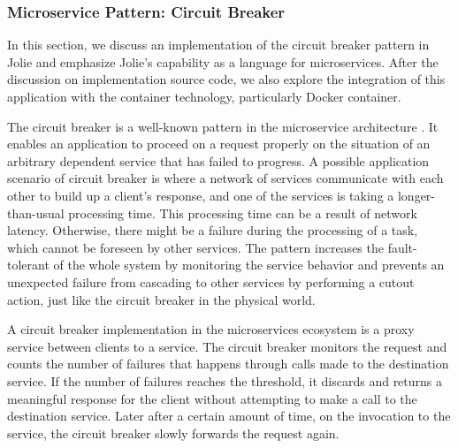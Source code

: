 \FloatBarrier

\subsubsection{Microservice Pattern: Circuit Breaker}

In this section, we discuss an implementation of the circuit breaker pattern in Jolie and emphasize Jolie’s capability as a language for microservices. After the discussion on implementation source code, we also explore the integration of this application with the container technology, particularly Docker container.

The circuit breaker is a well-known pattern in the microservice architecture \cite{martin-2015-circuit, microservices.io-circuit}. It enables an application to proceed on a request properly on the situation of an arbitrary dependent service that has failed to progress. A possible application scenario of circuit breaker is where a network of services communicate with each other to build up a client’s response, and one of the services is taking a longer-than-usual processing time. This processing time can be a result of network latency. Otherwise, there might be a failure during the processing of a task, which cannot be foreseen by other services. The pattern increases the fault-tolerant of the whole system by monitoring the service behavior and prevents an unexpected failure from cascading to other services by performing a cutout action, just like the circuit breaker in the physical world.

A circuit breaker implementation in the microservices ecosystem is a proxy service between clients to a service. The circuit breaker monitors the request and counts the number of failures that happens through calls made to the destination service. If the number of failures reaches the threshold, it discards and returns a meaningful response for the client without attempting to make a call to the destination service. Later after a certain amount of time, on the invocation to the service, the circuit breaker slowly forwards the request again.

